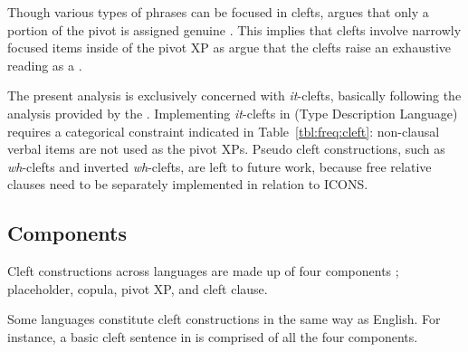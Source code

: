 

\noindent Though various types of phrases can be focused in clefts,
\citet{velleman:etal:12} argues that only a portion of the pivot is
assigned genuine . This implies that clefts involve narrowly
focused items inside of the pivot XP as \citet{beaver:clark:08} argue
that the clefts raise an exhaustive reading as a .



The present analysis is exclusively concerned with \textit{it}-clefts,
basically following the analysis provided by the .  Implementing
\textit{it}-clefts in  (Type Description Language)
requires a categorical constraint indicated
in Table~\ref{tbl:freq:cleft}: non-clausal verbal items are not used
as the pivot XPs.  Pseudo cleft constructions, such as
\textit{wh}-clefts and inverted \textit{wh}-clefts, are left to future
work, because free relative clauses need to be separately implemented
in relation to ICONS.


\subsection{Components}
\label{10:sssec:clefts:components}

Cleft constructions across languages are made up of four components
\citep{gundel:02,kim:yang:09,kim:12a};  placeholder,  copula,
pivot XP, and cleft clause.






\noindent Some languages constitute cleft constructions in the same
way as English.  For instance, a basic cleft sentence
 in  is comprised of all the four
components.


